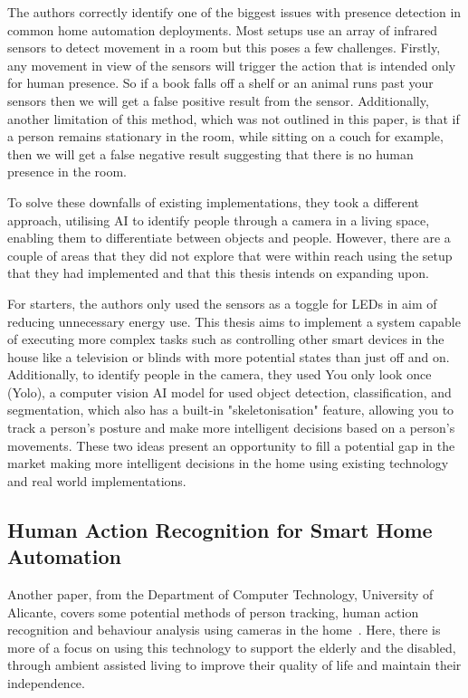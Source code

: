 The authors correctly identify one of the biggest issues with presence detection in common home automation deployments.
Most setups use an array of infrared sensors to detect movement in a room but this poses a few challenges.
Firstly, any movement in view of the sensors will trigger the action that is intended only for human presence.
So if a book falls off a shelf or an animal runs past your sensors then we will get a false positive result from the sensor.
Additionally, another limitation of this method, which was not outlined in this paper, is that if a person remains stationary in the room, while sitting on a couch for example, then we will get a false negative result suggesting that there is no human presence in the room.

To solve these downfalls of existing implementations, they took a different approach, utilising AI to identify people through a camera in a living space, enabling them to differentiate between objects and people.
However, there are a couple of areas that they did not explore that were within reach using the setup that they had implemented and that this thesis intends on expanding upon.

For starters, the authors only used the sensors as a toggle for LEDs in aim of reducing unnecessary energy use.
This thesis aims to implement a system capable of executing more complex tasks such as controlling other smart devices in the house like a television or blinds with more potential states than just off and on.
Additionally, to identify people in the camera, they used You only look once (Yolo), a computer vision AI model for used object detection, classification, and segmentation, which also has a built-in "skeletonisation" feature, allowing you to track a person's posture and make more intelligent decisions based on a person's movements.
These two ideas present an opportunity to fill a potential gap in the market making more intelligent decisions in the home using existing technology and real world implementations.

\subsection{Human Action Recognition for Smart Home Automation}
Another paper, from the Department of Computer Technology, University of Alicante, covers some potential methods of person tracking, human action recognition and behaviour analysis using cameras in the home~\cite{Chaa13}.
Here, there is more of a focus on using this technology to support the elderly and the disabled, through ambient assisted living to improve their quality of life and maintain their independence.

